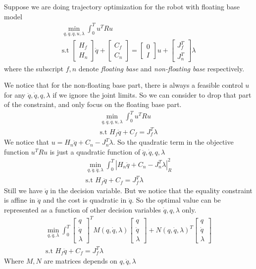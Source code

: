 \documentclass{article}
\begin{document}
Suppose we are doing trajectory optimization for the robot with floating base model
\begin{align}
\min_{q,\dot{q},\ddot{q},u,\lambda} \int^T_0 u^TRu\\
\text{s.t } \begin{bmatrix} H_f\\H_n\end{bmatrix}\ddot{q}+\begin{bmatrix}C_f\\C_n\end{bmatrix}=\begin{bmatrix}0\\I\end{bmatrix}u+\begin{bmatrix}J_f^T\\J_n^T\end{bmatrix}\lambda
\end{align}
where the subscript $f,n$ denote \textsl{floating base} and \textsl{non-floating base} respectively.

We notice that for the non-floating base part, there is always a feasible control $u$ for any $\ddot{q},\dot{q},q,\lambda$ if we ignore the joint limits. So we can consider to drop that part of the constraint, and only focus on the floating base part.
\begin{align}
\min_{q,\dot{q},\ddot{q},u,\lambda} \int^T_0 u^TRu\\
\text{s.t } H_f\ddot{q}+C_f=J_f^T\lambda
\end{align}
We notice that $u=H_n\ddot{q}+C_n-J_n^T\lambda$. So the quadratic term in the objective function $u^TRu$ is just a quadratic function of $\ddot{q},\dot{q},q,\lambda$
\begin{align}
\min_{q,\dot{q},\ddot{q},\lambda} \int^T_0 |H_n\ddot{q}+C_n-J_n^T\lambda|^2_R\\
\text{s.t } H_f\ddot{q}+C_f=J_f^T\lambda
\end{align}
Still we have $\ddot{q}$ in the decision variable. But we notice that the equality constraint is affine in $\ddot{q}$ and the cost is quadratic in $\ddot{q}$. So the optimal value can be represented as a function of other decision variables $\dot{q},q,\lambda$ only.
\begin{align}
\min_{q,\dot{q},\lambda} \int^T_0 \begin{bmatrix}q\\\dot{q}\\\lambda\end{bmatrix}^TM(q,\dot{q},\lambda)\begin{bmatrix}q\\\dot{q}\\\lambda\end{bmatrix}+N(q,\dot{q},\lambda)^T\begin{bmatrix}q\\\dot{q}\\\lambda\end{bmatrix}\\
\text{s.t } H_f\ddot{q}+C_f=J_f^T\lambda
\end{align}
Where $M,N$ are matrices depends on $q,\dot{q},\lambda$
\end{document}
